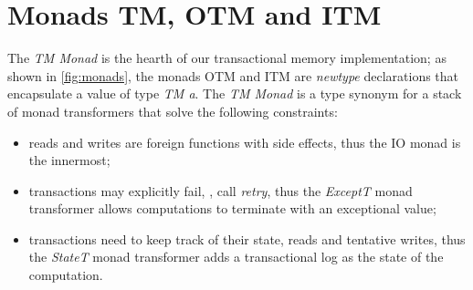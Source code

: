 \section{Monads TM, OTM and ITM}
The \emph{TM Monad} is the hearth of our transactional memory implementation;
as shown in \cref{fig:monads}, the monads OTM and ITM are \emph{newtype} declarations that encapsulate a value of type \emph{TM a}.
The \emph{TM Monad} is a type synonym for a stack of monad transformers that solve the following constraints:
\begin{itemize}
\item reads and writes are foreign functions with side effects, thus the IO monad is the innermost;
\item transactions may explicitly fail, \ie, call \emph{retry}, thus the \emph{ExceptT} monad transformer allows computations to terminate with an exceptional value;
\item transactions need to keep track of their state, reads and tentative writes, thus the \emph{StateT} monad transformer adds a transactional log as the state of the computation.

\end{itemize}
